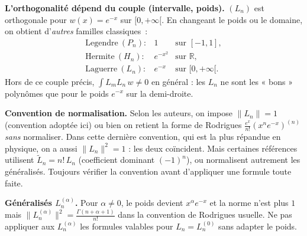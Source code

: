 \vspace{6pt}

\begin{mdframed}[style=cexbar]
  \textbf{L'orthogonalité dépend du couple (intervalle, poids).}\enspace
  $(L_n)$ est orthogonale pour $w(x)=e^{-x}$ sur $[0,+\infty[$. En changeant le
  poids ou le domaine, on obtient d'\emph{autres} familles classiques~:
  \[
    \begin{array}{lll}
      \text{Legendre}\ (P_n): & 1        & \text{sur } [-1,1],\\
      \text{Hermite}\ (H_n):  & e^{-x^2} & \text{sur } \mathbb{R},\\
      \text{Laguerre}\ (L_n): & e^{-x}   & \text{sur } [0,+\infty[.
    \end{array}
  \]
  Hors de ce couple précis, $\int L_m L_n\,w\neq 0$ en général : les $L_n$ ne
  sont les « bons » polynômes que pour le poids $e^{-x}$ sur la demi-droite.

  \smallskip\noindent
  \textbf{Convention de normalisation.}\enspace
  Selon les auteurs, on impose $\|L_n\|=1$ (convention adoptée ici) ou bien on
  retient la forme de Rodrigues $\frac{e^x}{n!}(x^n e^{-x})^{(n)}$ \emph{sans}
  normaliser. Dans cette dernière convention, qui est la plus répandue en
  physique, on a aussi $\|L_n\|^2=1$ : les deux coïncident. Mais certaines
  références utilisent $\widetilde L_n=n!\,L_n$ (coefficient dominant
  ${(-1)}^n$), ou normalisent autrement les généralisés. Toujours vérifier la
  convention avant d'appliquer une formule toute faite.

  \smallskip\noindent
  \textbf{Généralisés $L_n^{(\alpha)}$.}\enspace
  Pour $\alpha\neq 0$, le poids devient $x^{\alpha}e^{-x}$ et la norme n'est
  plus $1$ mais $\|L_n^{(\alpha)}\|^2=\frac{\Gamma(n+\alpha+1)}{n!}$ dans la
  convention de Rodrigues usuelle. Ne pas appliquer aux $L_n^{(\alpha)}$ les
  formules valables pour $L_n=L_n^{(0)}$ sans adapter le poids.
\end{mdframed}

\vspace{6pt}
\exolabel


